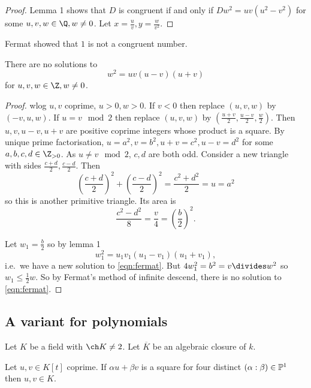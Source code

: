 \documentclass[a4paper]{article}
\begin{document}
\begin{proof}
  Lemma 1 shows that \(D\) is congruent if and only if \(Dw^2 = uv(u^2 - v^2)\) for some \(u, v, w \in \Q, w \neq 0\). Let \(x = \frac{u}{v}, y = \frac{w}{v^2}\).
\end{proof}

Fermat showed that \(1\) is not a congruent number.

\begin{theorem}
  There are no solutions to
  \begin{equation}
    \label{eqn:fermat}
    w^2 = uv (u - v)(u + v)
    \tag{\ast}
  \end{equation}
  for \(u, v, w \in \Z, w \neq 0\).
\end{theorem}

\begin{proof}
  wlog \(u, v \) coprime, \(u > 0, w > 0\). If \(v < 0\) then replace \((u, v, w)\) by \((-v, u, w)\). If \(u = v \mod 2\) then replace \((u, v, w)\) by \((\frac{u + v}{2}, \frac{u - v}{2}, \frac{w}{2})\). Then \(u, v, u - v, u + v\) are positive coprime integers whose product is a square. By unique prime factorisation, \(u = a^2, v = b^2, u + v = c^2, u - v = d^2\) for some \(a, b, c, d \in \Z_{> 0}\). As \(u \neq v \mod 2\), \(c, d\) are both odd. Consider a new triangle with sides \(\frac{c + d}{2}, \frac{c - d}{2}\). Then
  \[
    \left( \frac{c + d}{2} \right)^2 + \left( \frac{c - d}{2} \right)^2 = \frac{c^2 + d^2}{2} = u = a^2
  \]
  so this is another primitive triangle. Its area is
  \[
    \frac{c^2 - d^2}{8} = \frac{v}{4} = \left( \frac{b}{2} \right)^2.
  \]

  Let \(w_1 = \frac{b}{2}\) so by lemma 1
  \[
    w_1^2 = u_1v_1 (u_1 - v_1)(u_1 + v_1),
  \]
  i.e.\ we have a new solution to \eqref{eqn:fermat}. But \(4 w_1^2 = b^2 = v \divides w^2\) so \(w_1 \leq \frac{1}{2} w\). So by Fermat's method of infinite descend, there is no solution to \eqref{eqn:fermat}.
\end{proof}

\subsection{A variant for polynomials}

Let \(K\) be a field with \(\ch K \neq 2\). Let \(\overline K\) be an algebraic closure of \(k\).

\begin{lemma}
  Let \(u, v \in K[t]\) coprime. If \(\alpha u + \beta v\) is a square for four distinct \((\alpha: \beta) \in \P^1\) then \(u, v \in K\).
\end{lemma}
\end{document}
